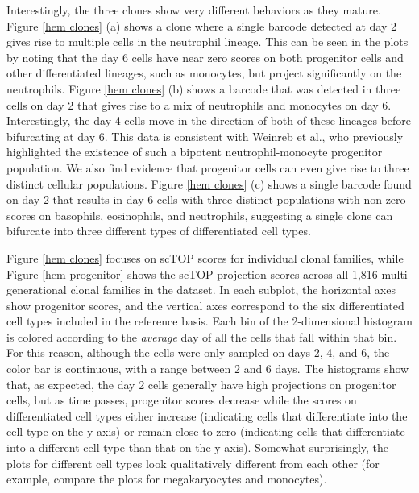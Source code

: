 \documentclass[vruler,JEB]{COB}%
\begin{document}
Interestingly, the three clones show very different behaviors as they mature. Figure \ref{hem clones} (a) shows a clone where a single barcode detected at day 2 gives rise to multiple cells in the neutrophil lineage. This can be seen in the plots by noting that the day 6 cells have near zero scores on both progenitor cells and other differentiated lineages, such as monocytes, but project significantly on the neutrophils. Figure \ref{hem clones} (b) shows a barcode that was detected in three cells on day 2 that gives rise to a mix of neutrophils and monocytes on day 6. Interestingly, the day 4 cells move in the direction of both of these lineages before bifurcating at day 6. This data is consistent with Weinreb et al., who previously highlighted the existence of such a bipotent neutrophil-monocyte progenitor population. We also find evidence that progenitor cells can even give rise to three distinct cellular populations. Figure \ref{hem clones} (c) shows a single barcode found on day 2 that results in day 6 cells with three distinct populations with non-zero scores on basophils, eosinophils, and neutrophils, suggesting a single clone can bifurcate into three different types of differentiated cell types.

Figure \ref{hem clones} focuses on scTOP scores for individual clonal families, while Figure \ref{hem progenitor} shows the scTOP projection scores across all 1,816 multi-generational clonal families in the dataset. In each subplot, the horizontal axes show progenitor scores, and the vertical axes correspond to the six differentiated cell types included in the reference basis. Each bin of the 2-dimensional histogram is colored according to the {\it average} day of all the cells that fall within that bin. For this reason, although the cells were only sampled on days 2, 4, and 6, the color bar is continuous, with a range between 2 and 6 days. The histograms show that, as expected, the day 2 cells generally have high projections on progenitor cells, but as time passes, progenitor scores decrease while the scores on differentiated cell types either increase (indicating cells that differentiate into the cell type on the y-axis) or remain close to zero (indicating cells that differentiate into a different cell type than that on the y-axis). Somewhat surprisingly, the plots for different cell types look qualitatively different from each other (for example, compare the plots for megakaryocytes and monocytes). 
\end{document}
